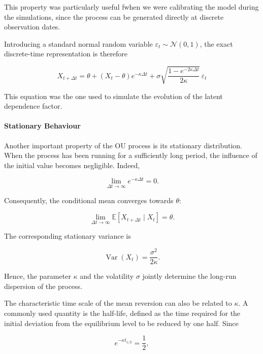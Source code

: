 \documentclass{article}
\begin{document}
This property was particularly useful fwhen we were calibrating the model during the simulations, since the process can be generated directly at discrete observation dates.

Introducing a standard normal random variable
$\varepsilon_t\sim\mathcal{N}(0,1)$, the exact discrete-time
representation is therefore

\begin{equation}
\boxed{
X_{t+\Delta t}
=
\theta
+
(X_t-\theta)e^{-\kappa\Delta t}
+
\sigma
\sqrt{
\frac{1-e^{-2\kappa\Delta t}}{2\kappa}
}
\,\varepsilon_t
}
\end{equation}

This equation was the one used to simulate the evolution of the
latent dependence factor.

\paragraph{Stationary Behaviour}

Another important property of the OU process is its stationary
distribution. When the process has been running for a sufficiently
long period, the influence of the initial value becomes negligible.
Indeed,

\begin{equation}
\lim_{\Delta t\rightarrow\infty}
e^{-\kappa\Delta t}
=
0.
\end{equation}

Consequently, the conditional mean converges towards $\theta$:

\begin{equation}
\lim_{\Delta t\rightarrow\infty}
\mathbb{E}[X_{t+\Delta t}\mid X_t]
=
\theta.
\end{equation}

The corresponding stationary variance is

\begin{equation}
\operatorname{Var}(X_t)
=
\frac{\sigma^2}{2\kappa}.
\end{equation}

Hence, the parameter $\kappa$ and the volatility $\sigma$ jointly
determine the long-run dispersion of the process.

The characteristic time scale of the mean reversion can also be
related to $\kappa$. A commonly used quantity is the half-life,
defined as the time required for the initial deviation from the
equilibrium level to be reduced by one half. Since

\begin{equation}
e^{-\kappa t_{1/2}}=\frac{1}{2},
\end{equation}
\end{document}
